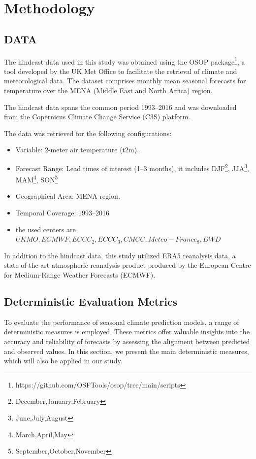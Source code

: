 \section{Methodology}

\subsection{DATA}

The hindcast data used in this study was obtained using the OSOP package\footnote{https://github.com/OSFTools/osop/tree/main/scripts}, a tool developed by the UK Met Office to facilitate the retrieval of climate and meteorological data. The dataset comprises monthly mean seasonal forecasts for temperature over the MENA (Middle East and North Africa) region.


The hindcast data spans the common period 1993–2016 and was downloaded from the Copernicus Climate Change Service (C3S) platform. 


The data was retrieved for the following configurations:
\begin{itemize}
	\item Variable: 2-meter air temperature (t2m).
	\item Forecast Range: Lead times of interest (1–3 months), it includes DJF\footnote{December,January,February}, JJA\footnote{June,July,August}, MAM\footnote{March,April,May}, SON\footnote{September,October,November}
	\item Geographical Area: MENA region.
	\item Temporal Coverage: 1993–2016
	\item the used centers are $UKMO,ECMWF,ECCC_2,ECCC_3,CMCC,Meteo-France_8,DWD$
\end{itemize}


In addition to the hindcast data, this study utilized ERA5 reanalysis data, a state-of-the-art atmospheric reanalysis product produced by the European Centre for Medium-Range Weather Forecasts (ECMWF). 

    

\subsection{Deterministic Evaluation Metrics}
To evaluate the performance of seasonal climate prediction models, a range of deterministic measures is employed. These metrics offer valuable insights into the accuracy and reliability of forecasts by assessing the alignment between predicted and observed values. In this section, we present the main deterministic measures, which will also be applied in our study.
